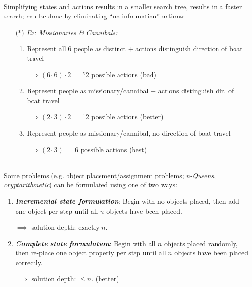 \documentclass[12pt]{extarticle}
\theoremstyle{definition}
\theoremstyle{remark}
\newcommand{\pstart}[0]{\noindent}
\newcommand{\newp}[0]{~\\ \pstart}
\newcommand{\term}[1]{\noindent\textbf{\textit{#1}}}
\begin{document}
\newp
Simplifying states and actions results in a smaller search tree, results in a faster search; can be done by eliminating ``no-information'' actions:\begin{itemize}
    \item[($\ast$)] \textit{Ex: Missionaries \& Cannibals:}
    \begin{enumerate}
        \item Represent all 6 people as distinct $+$ actions distinguish direction of boat travel

        $\implies(6\cdot 6)\cdot2=$ \ul{72 possible actions} (bad)
        \item Represent people as missionary/cannibal $+$ actions distinguish dir. of boat travel

        $\implies(2\cdot 3)\cdot2=$ \ul{12 possible actions} (better)
        \item Represent people as missionary/cannibal, no direction of boat travel

        $\implies(2\cdot 3)=$ \ul{6 possible actions} (best)
    \end{enumerate}
\end{itemize}

~\\ \pstart
Some problems (e.g. object placement/assignment problems; \textit{n-Queens}, \textit{cryptarithmetic}) can be formulated using one of two ways: \begin{enumerate}
    \item \term{Incremental state formulation}: Begin with no objects placed, then add one object per step until all $n$ objects have been placed. 
    
    $\implies$ solution depth: exactly $n$.
    \item \term{Complete state formulation}: Begin with all $n$ objects placed randomly, then re-place one object properly per step until all $n$ objects have been placed correctly.

    $\implies$ solution depth: $\leq n$. (better)
\end{enumerate}
\end{document}
